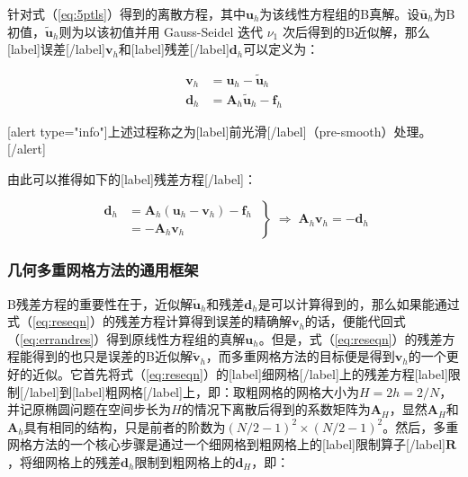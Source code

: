 \documentclass[12pt, UTF8, nofonts]{ctexart}
\begin{document}
针对式（\ref{eq:5ptls}）得到的离散方程，其中$\boldsymbol{u}_h$为该线性方程组的B真解。设$\bar{\boldsymbol{u}}_h$为B初值，$\tilde{\boldsymbol{u}}_h$则为以该初值并用 Gauss-Seidel 迭代 $\nu_1$ 次后得到的B近似解，那么[label]误差[/label]$\boldsymbol{v}_h$和[label]残差[/label]$\boldsymbol{d}_h$可以定义为：

\begin{equation}
  \label{eq:errandres}
  \begin{aligned}
    \boldsymbol{v}_h &= \boldsymbol{u}_h - \tilde{\boldsymbol{u}}_h \\
    \boldsymbol{d}_h &= \boldsymbol{A}_h\tilde{\boldsymbol{u}}_h - \boldsymbol{f}_h
  \end{aligned}
\end{equation}

[alert type="info"]上述过程称之为[label]前光滑[/label]（pre-smooth）处理。[/alert]

由此可以推得如下的[label]残差方程[/label]：

\begin{equation}
  \label{eq:reseqn}
  \left.\begin{aligned}
    \boldsymbol{d}_h &= \boldsymbol{A}_h(\boldsymbol{u}_h - \boldsymbol{v}_h) - \boldsymbol{f}_h \\
    &= - \boldsymbol{A}_h\boldsymbol{v}_h
  \end{aligned} \;\right\} \;\Rightarrow\;
  \boldsymbol{A}_h\boldsymbol{v}_h = -\boldsymbol{d}_h
\end{equation}

\subsubsection*{几何多重网格方法的通用框架}

B残差方程的重要性在于，近似解$\tilde{\boldsymbol{u}}_h$和残差$\boldsymbol{d}_h$是可以计算得到的，那么如果能通过式（\ref{eq:reseqn}）的残差方程计算得到误差的精确解$\boldsymbol{v}_h$的话，便能代回式（\ref{eq:errandres}）得到原线性方程组的真解$\boldsymbol{u}_h$。但是，式（\ref{eq:reseqn}）的残差方程能得到的也只是误差的B近似解$\tilde{\boldsymbol{v}}_h$，而多重网格方法的目标便是得到$\boldsymbol{v}_h$的一个更好的近似。它首先将式（\ref{eq:reseqn}）的[label]细网格[/label]上的残差方程[label]限制[/label]到[label]粗网格[/label]上，即：取粗网格的网格大小为$H=2h=2/N$，并记原椭圆问题在空间步长为$H$的情况下离散后得到的系数矩阵为$\boldsymbol{A}_H$，显然$\boldsymbol{A}_H$和$\boldsymbol{A}_h$具有相同的结构，只是前者的阶数为$(N/2-1)^2\times(N/2-1)^2$。然后，多重网格方法的一个核心步骤是通过一个细网格到粗网格上的[label]限制算子[/label]$\boldsymbol{R}$，将细网格上的残差$\boldsymbol{d}_h$限制到粗网格上的$\boldsymbol{d}_H$，即：
\end{document}

